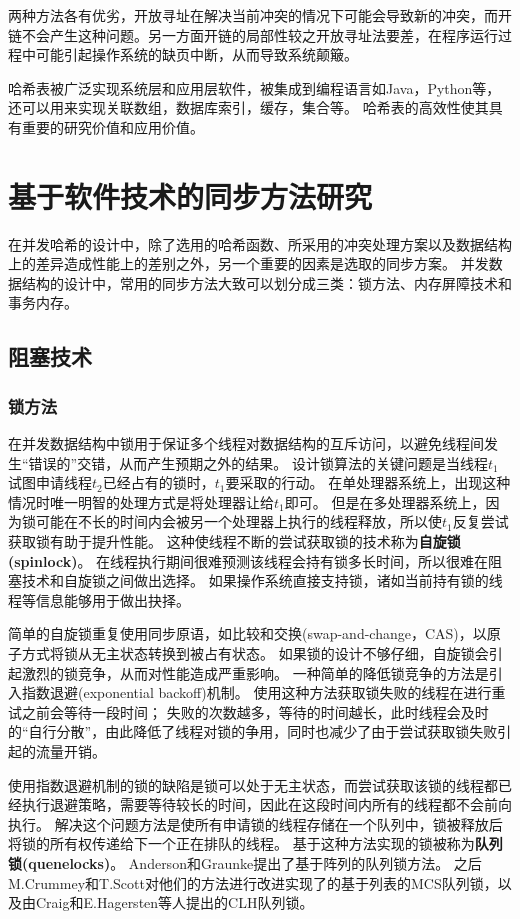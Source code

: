 两种方法各有优劣，开放寻址在解决当前冲突的情况下可能会导致新的冲突，而开链不会产生这种问题。另一方面开链的局部性较之开放寻址法要差，在程序运行过程中可能引起操作系统的缺页中断，从而导致系统颠簸。

哈希表被广泛实现系统层和应用层软件，被集成到编程语言如Java，Python等，还可以用来实现关联数组，数据库索引，缓存，集合等。
哈希表的高效性使其具有重要的研究价值和应用价值。

\section{基于软件技术的同步方法研究}

在并发哈希的设计中，除了选用的哈希函数、所采用的冲突处理方案以及数据结构上的差异造成性能上的差别之外，另一个重要的因素是选取的同步方案。
并发数据结构的设计中，常用的同步方法大致可以划分成三类：锁方法、内存屏障技术和事务内存。

\subsection{阻塞技术}
\subsubsection{锁方法}
在并发数据结构中锁用于保证多个线程对数据结构的互斥访问，以避免线程间发生“错误的”交错，从而产生预期之外的结果。
设计锁算法的关键问题是当线程$t_1$试图申请线程$t_2$已经占有的锁时，$t_1$要采取的行动。
在单处理器系统上，出现这种情况时唯一明智的处理方式是将处理器让给$t_1$即可。
但是在多处理器系统上，因为锁可能在不长的时间内会被另一个处理器上执行的线程释放，所以使$t_1$反复尝试获取锁有助于提升性能。
这种使线程不断的尝试获取锁的技术称为\textbf{自旋锁(spinlock)}。
在线程执行期间很难预测该线程会持有锁多长时间，所以很难在阻塞技术和自旋锁之间做出选择。
如果操作系统直接支持锁，诸如当前持有锁的线程等信息能够用于做出抉择。

简单的自旋锁重复使用同步原语，如比较和交换(swap-and-change，CAS)，以原子方式将锁从无主状态转换到被占有状态。 如果锁的设计不够仔细，自旋锁会引起激烈的锁竞争，从而对性能造成严重影响。
一种简单的降低锁竞争的方法是引入指数退避(exponential backoff)机制\cite{agarwal1989adaptive}。
使用这种方法获取锁失败的线程在进行重试之前会等待一段时间；
失败的次数越多，等待的时间越长，此时线程会及时的“自行分散”，由此降低了线程对锁的争用，同时也减少了由于尝试获取锁失败引起的流量开销。

使用指数退避机制的锁的缺陷是锁可以处于无主状态，而尝试获取该锁的线程都已经执行退避策略，需要等待较长的时间，因此在这段时间内所有的线程都不会前向执行。
解决这个问题方法是使所有申请锁的线程存储在一个队列中，锁被释放后将锁的所有权传递给下一个正在排队的线程。
基于这种方法实现的锁被称为\textbf{队列锁(quenelocks)}。
Anderson\cite{anderson1989performance}和Graunke\cite{graunke1990synchronization}提出了基于阵列的队列锁方法。
之后M.Crummey和T.Scott\cite{mellor1991algorithms}对他们的方法进行改进实现了的基于列表的MCS队列锁，以及由Craig和E.Hagersten等人\cite{craig1993building,magnusson1994queue}提出的CLH队列锁。

